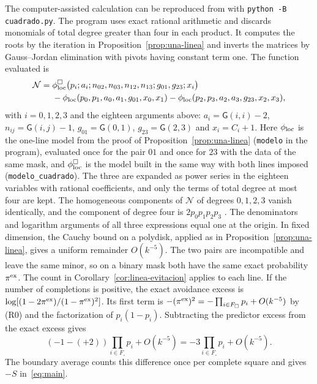 The computer-assisted calculation can be reproduced from  with
\texttt{python -B cuadrado.py}. The program uses exact rational arithmetic and discards monomials of
total degree greater than four in each product. It computes the roots by the iteration in
Proposition~\ref{prop:una-linea} and inverts the matrices by Gauss--Jordan elimination with pivots
having constant term one. The function evaluated is
\begin{align}
 \mathcal N={}&\phi_{\mathrm{loc}}^{\square}\bigl(p_i;a_i;n_{02},n_{03},n_{12},n_{13};g_{01},g_{23};x_i\bigr)\notag\\
  &-\phi_{\mathrm{loc}}(p_0,p_1,a_0,a_1,g_{01},x_0,x_1)-\phi_{\mathrm{loc}}(p_2,p_3,a_2,a_3,g_{23},x_2,x_3),
  \label{eq:funcion-cuadrado}
\end{align}
with $i=0,1,2,3$ and the eighteen arguments above: $a_i=\mathsf G(i,i)-2$, $n_{ij}=\mathsf G(i,j)-1$,
$g_{01}=\mathsf G(0,1)$, $g_{23}=\mathsf G(2,3)$ and $x_i=C_i+1$. Here $\phi_{\mathrm{loc}}$ is the one-line model
from the proof of Proposition~\ref{prop:una-linea} (\texttt{modelo} in the program), evaluated once for
the pair $01$ and once for $23$ with the data of the same mask, and $\phi_{\mathrm{loc}}^{\square}$ is the model
built in the same way with both lines imposed (\texttt{modelo\_cuadrado}). The three are expanded as
power series in the eighteen variables with rational coefficients, and only the terms of total degree at
most four are kept. The homogeneous components of $\mathcal N$ of degrees $0,1,2,3$ vanish identically,
and the component of degree four is $2p_0p_1p_2p_3$ . The denominators and logarithm arguments of
all
three expressions equal one at the origin. In fixed dimension, the Cauchy bound on a polydisk,
applied as in Proposition~\ref{prop:una-linea}, gives a uniform remainder $O(k^{-5})$. The two
pairs are incompatible and leave the same minor, so on a binary mask both have the same exact
probability $\pi^{\rm ex}$. The count in Corollary~\ref{cor:linea-evitacion}
applies to each line. If the number of completions is positive, the exact avoidance excess is
$\log[(1-2\pi^{\rm ex})/(1-\pi^{\rm ex})^2]$. Its first term is $-(\pi^{\rm ex})^2=-\prod_{i\in
F_\square}p_i+O(k^{-5})$ by (R0) and the factorization of $p_i(1-p_i)$. Subtracting the predictor
excess from the exact excess gives
\begin{equation}\label{eq:exceso-cuadrado}
 (-1-(+2))\prod_{i\in F_\square}p_i+O(k^{-5})=-3\prod_{i\in F_\square}p_i+O(k^{-5}).
\end{equation}
The boundary average counts this difference once per complete square and gives $-S$
in~\eqref{eq:main}.
